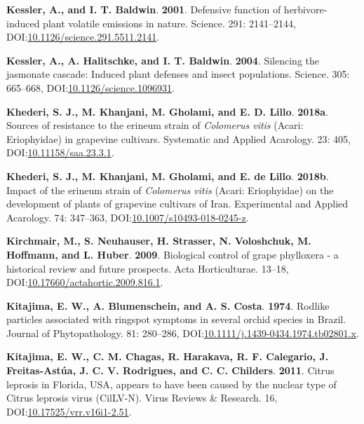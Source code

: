 \documentclass[12pt,final,CPage]{ufthesis}
\newlength{\cslhangindent}
\newenvironment{CSLReferences}[2] %
{%
	\setlength{\parindent}{0pt}
	\ifodd #1 \everypar{\setlength{\hangindent}{\cslhangindent}}\ignorespaces\fi
	\ifnum #2 > 0
	\setlength{\parskip}{#2\baselineskip}
	\fi
}%
{}
\begin{document}
{\begin{CSLReferences}{1}{0}
  \leavevmode{}%
  \textbf{Kessler, A., and I. T. Baldwin}. \textbf{2001}. Defensive function of herbivore-induced plant volatile emissions in nature. Science. 291: 2141--2144, DOI:\href{https://doi.org/10.1126/science.291.5511.2141}{10.1126/science.291.5511.2141}.

  \leavevmode{}%
  \textbf{Kessler, A., A. Halitschke, and I. T. Baldwin}. \textbf{2004}. Silencing the jasmonate cascade: Induced plant defenses and insect populations. Science. 305: 665--668, DOI:\href{https://doi.org/10.1126/science.1096931}{10.1126/science.1096931}.

  \leavevmode{}%
  \textbf{Khederi, S. J., M. Khanjani, M. Gholami, and E. D. Lillo}. \textbf{2018a}. Sources of resistance to the erineum strain of {\emph{Colomerus vitis}} ({Acari}: {Eriophyidae}) in grapevine cultivars. Systematic and Applied Acarology. 23: 405, DOI:\href{https://doi.org/10.11158/saa.23.3.1}{10.11158/saa.23.3.1}.

  \leavevmode{}%
  \textbf{Khederi, S. J., M. Khanjani, M. Gholami, and E. de Lillo}. \textbf{2018b}. Impact of the erineum strain of {\emph{Colomerus vitis}} ({Acari}: {Eriophyidae}) on the development of plants of grapevine cultivars of {Iran}. Experimental and Applied Acarology. 74: 347--363, DOI:\href{https://doi.org/10.1007/s10493-018-0245-z}{10.1007/s10493-018-0245-z}.

  \leavevmode{}%
  \textbf{Kirchmair, M., S. Neuhauser, H. Strasser, N. Voloshchuk, M. Hoffmann, and L. Huber}. \textbf{2009}. Biological control of grape phylloxera - a historical review and future prospects. Acta Horticulturae. 13--18, DOI:\href{https://doi.org/10.17660/actahortic.2009.816.1}{10.17660/actahortic.2009.816.1}.

  \leavevmode{}%
  \textbf{Kitajima, E. W., A. Blumenschein, and A. S. Costa}. \textbf{1974}. Rodlike particles associated with ringspot symptoms in several orchid species in {Brazil}. Journal of Phytopathology. 81: 280--286, DOI:\href{https://doi.org/10.1111/j.1439-0434.1974.tb02801.x}{10.1111/j.1439-0434.1974.tb02801.x}.

  \leavevmode{}%
  \textbf{Kitajima, E. W., C. M. Chagas, R. Harakava, R. F. Calegario, J. Freitas-Astúa, J. C. V. Rodrigues, and C. C. Childers}. \textbf{2011}. {Citrus leprosis} in {Florida}, {USA}, appears to have been caused by the nuclear type of {Citrus leprosis virus} ({CilLV-N}). Virus Reviews {\&} Research. 16, DOI:\href{https://doi.org/10.17525/vrr.v16i1-2.51}{10.17525/vrr.v16i1-2.51}.


\end{CSLReferences}}
\end{document}
